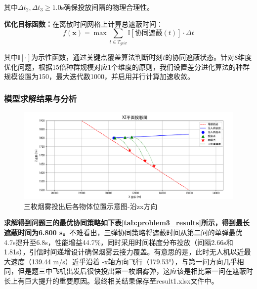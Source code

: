 \documentclass[fontset=SimSun]{ctexart}
\begin{document}
其中$\Delta t_2, \Delta t_3 \geq 1.0$s确保投放间隔的物理合理性。

\textbf{优化目标函数：}在离散时间网格上计算总遮蔽时间：
\begin{equation}
f(\mathbf{x}) = \max \sum_{t \in T_{grid}} \mathbb{I}[\text{协同遮蔽}(t)] \cdot \Delta t
\end{equation}

其中$\mathbb{I}[\cdot]$为示性函数，通过关键点覆盖算法判断时刻$t$的协同遮蔽状态。针对8维度优化问题，根据15倍种群规模对应1个维度的原则，我们设置差分进化算法的种群规模设置为150，最大迭代数1000，并启用并行计算加速收敛。

\subsubsection{模型求解结果与分析}

\begin{figure}[H]
    \centering
    \includegraphics[width=\textwidth]{6.问题3中烟雾弹投掷zx方向视图.png}
    \caption{三枚烟雾投出后各物体位置示意图-沿zx方向}
    \label{fig:obscuration_cases}
\end{figure}

\textbf{求解得到问题三的最优协同策略如下表\ref{tab:problem3_results}所示，得到最长遮蔽时间为6.800 s。}不难看出，三弹协同策略将遮蔽时间从第二问的单弹最优4.7s提升至6.8s，性能增益44.7\%，同时采用时间梯度分布投放（间隔2.66s和1.81s），引信时间递增设计确保烟雾云接力覆盖。有意思的是，此时无人机以近最大速度（139.44 m/s）近乎沿着 -x轴方向飞行（179.53°），与第一问方向几乎相同，但是题三中飞机出发后很快投出第一枚烟雾弹，这应该是相比第一问在遮蔽时长上有巨大提升的重要原因。最终相关结果保存至result1.xlsx文件中。
\end{document}
